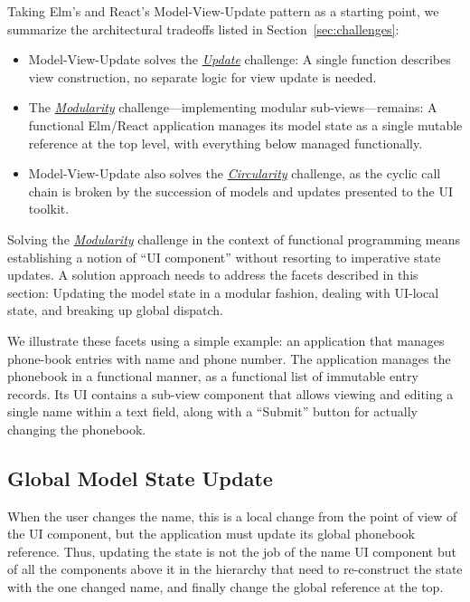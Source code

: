 \documentclass[sigplan,screen]{acmart}
\begin{document}
Taking Elm's and React's Model-View-Update pattern as a starting
point, we summarize the architectural tradeoffs listed in
Section~\ref{sec:challenges}:
%
\begin{itemize}
\item Model-View-Update solves the \hyperlink{challenge:update}{\textit{Update}} challenge: A single function
  describes view construction, no separate logic for view update is
  needed.
\item The \hyperlink{challenge:modularity}{\textit{Modularity}} challenge---implementing modular sub-views---remains:
  A functional Elm/React application manages its model
  state as a single mutable reference at the top level, with
  everything below managed functionally.
\item Model-View-Update also solves the \hyperlink{challenge:circularity}{\textit{Circularity}} challenge, as the cyclic call
  chain is broken by the succession of models and updates
  presented to the UI toolkit.
\end{itemize}
%
Solving the \hyperlink{challenge:modularity}{\textit{Modularity}} challenge in the context of functional programming
means establishing a notion of ``UI
component'' without resorting to imperative state updates.  A solution
approach needs to address the facets described in this section: Updating
the model state in a modular fashion, dealing with UI-local state, and
breaking up global dispatch.

We illustrate these facets using a simple example: an
application that manages phone-book entries with name and phone
number.  The application manages the phonebook in a functional
manner, as a functional list of immutable entry records.  Its UI
contains a sub-view component that allows viewing and editing a single
name within a text field, along with a ``Submit'' button for actually
changing the phonebook.


\subsection{Global Model State Update}

When the user changes the name, this is a local change from the point
of view of the UI component, but 
the application must update its global phonebook reference.  Thus,
updating the state is not the job of the name UI component
but of all the components above it in the hierarchy that need to
re-construct the state with the one changed name, and finally change
the global reference at the top.
\end{document}
